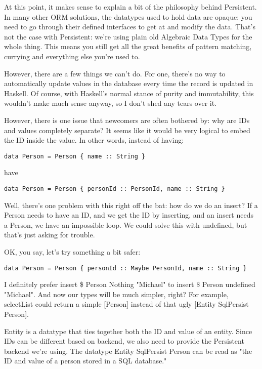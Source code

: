 At this point, it makes sense to explain a bit of the philosophy behind Persistent. In many other ORM solutions, the datatypes used to hold data are opaque: you need to go through their defined interfaces to get at and modify the data. That's not the case with Persistent: we're using plain old Algebraic Data Types for the whole thing. This means you still get all the great benefits of pattern matching, currying and everything else you're used to.

However, there are a few things we can't do. For one, there's no way to automatically update values in the database every time the record is updated in Haskell. Of course, with Haskell's normal stance of purity and immutability, this wouldn't make much sense anyway, so I don't shed any tears over it.

However, there is one issue that newcomers are often bothered by: why are IDs and values completely separate? It seems like it would be very logical to embed the ID inside the value. In other words, instead of having:

\begin{lstlisting}
data Person = Person { name :: String }
\end{lstlisting}

have

\begin{lstlisting}
data Person = Person { personId :: PersonId, name :: String }
\end{lstlisting}

Well, there's one problem with this right off the bat: how do we do an insert? If a Person needs to have an ID, and we get the ID by inserting, and an insert needs a Person, we have an impossible loop. We could solve this with undefined, but that's just asking for trouble.

OK, you say, let's try something a bit safer:

\begin{lstlisting}
data Person = Person { personId :: Maybe PersonId, name :: String }
\end{lstlisting}

I definitely prefer insert \$ Person Nothing "Michael" to insert \$ Person undefined "Michael". And now our types will be much simpler, right? For example, selectList could return a simple [Person] instead of that ugly [Entity SqlPersist Person].

Entity is a datatype that ties together both the ID and value of an entity. Since IDs can be different based on backend, we also need to provide the Persistent backend we're using. The datatype Entity SqlPersist Person can be read as "the ID and value of a person stored in a SQL database."

